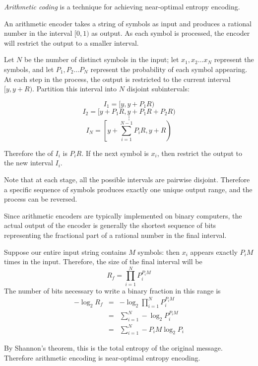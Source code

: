 \documentclass[12pt]{article}
\begin{document}
\emph{Arithmetic coding} is a technique for achieving near-optimal entropy encoding.

An arithmetic encoder takes a string of symbols as input and produces a rational number in the interval $[0, 1)$ as output.  As each symbol is processed, the encoder will restrict the output to a smaller interval.

Let $N$ be the number of distinct symbols in the input; let $x_1, x_2 \dots x_N$ represent the symbols, and let $P_1, P_2 \dots P_N$ represent the probability of each symbol appearing.  At each step in the process, the output is restricted to the current interval $[y, y + R)$.  Partition this interval into $N$ disjoint subintervals:

$$I_1 = [y, y + P_1R)$$
$$I_2 = [y+P_1R, y + P_1R + P_2R)$$
$$\vdots$$
$$I_N = \left[y+\sum_{i=1}^{N-1}P_iR, y + R\right)$$

Therefore the  of $I_i$ is $P_iR$.  If the next symbol is $x_i$, then restrict the output to the new interval $I_i$.

Note that at each stage, all the possible intervals are pairwise disjoint.  Therefore a specific sequence of symbols produces exactly one unique output range, and the process can be reversed.

Since arithmetic encoders are typically implemented on binary computers, the actual output of the encoder is generally the shortest sequence of bits representing the fractional part of a rational number in the final interval.

Suppose our entire input string contains $M$ symbols: then $x_i$ appears exactly $P_iM$ times in the input.  Therefore, the size of the final interval will be
$$R_f = \prod_{i=1}^N P_i^{P_iM}$$
The number of bits necessary to write a binary fraction in this range is
\begin{eqnarray*}
-\log_2 R_f& =& -\log_2 \prod_{i=1}^N P_i^{P_iM} \\
&=& \sum_{i=1}^N -\log_2 P_i^{P_iM} \\
&=& \sum_{i=1}^N -P_iM\log_2 P_i
\end{eqnarray*}

By Shannon's theorem, this is the total entropy of the original message.  Therefore arithmetic encoding is near-optimal entropy encoding.
\end{document}
